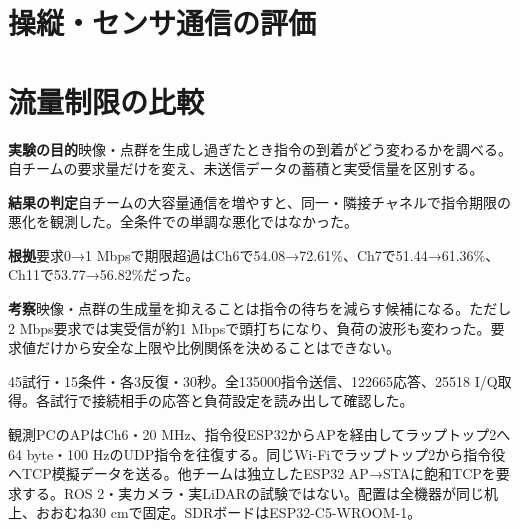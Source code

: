 \documentclass[a4paper,10pt]{ltjsarticle}
\begin{document}
\section*{操縦・センサ通信の評価}

\section{流量制限の比較}
\par\smallskip\noindent\textbf{実験の目的}\quad 映像・点群を生成し過ぎたとき指令の到着がどう変わるかを調べる。自チームの要求量だけを変え、未送信データの蓄積と実受信量を区別する。

\par\smallskip\noindent\textbf{結果の判定}\quad 自チームの大容量通信を増やすと、同一・隣接チャネルで指令期限の悪化を観測した。全条件での単調な悪化ではなかった。

\noindent\textbf{根拠}\quad 要求0→1 Mbpsで期限超過はCh6で54.08→72.61\%、Ch7で51.44→61.36\%、Ch11で53.77→56.82\%だった。

\noindent\textbf{考察}\quad 映像・点群の生成量を抑えることは指令の待ちを減らす候補になる。ただし2 Mbps要求では実受信が約1 Mbpsで頭打ちになり、負荷の波形も変わった。要求値だけから安全な上限や比例関係を決めることはできない。

45試行・15条件・各3反復・30秒。全135000指令送信、122665応答、25518 I/Q取得。各試行で接続相手の応答と負荷設定を読み出して確認した。

観測PCのAPはCh6・20 MHz、指令役ESP32からAPを経由してラップトップ2へ64 byte・100 HzのUDP指令を往復する。同じWi-Fiでラップトップ2から指令役へTCP模擬データを送る。他チームは独立したESP32 AP→STAに飽和TCPを要求する。ROS 2・実カメラ・実LiDARの試験ではない。配置は全機器が同じ机上、おおむね30 cmで固定。SDRボードはESP32-C5-WROOM-1。
\end{document}
